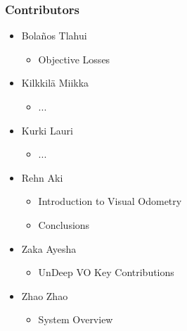 \documentclass{beamer}
\begin{document}
\begin{frame}
    \frametitle{Contributors}
    \begin{itemize}
        \item Bola\~nos Tlahui
            \begin{itemize}
                \item Objective Losses
            \end{itemize}
        \item Kilkkilä Miikka
            \begin{itemize}
                \item ...
            \end{itemize}
        \item Kurki Lauri
            \begin{itemize}
                \item ...
            \end{itemize}
        \item Rehn Aki
            \begin{itemize}
                \item Introduction to Visual Odometry
                \item Conclusions
            \end{itemize}
        \item Zaka Ayesha
            \begin{itemize}
                \item UnDeep VO Key Contributions
            \end{itemize}
        \item Zhao Zhao
            \begin{itemize}
                \item System Overview
            \end{itemize}
    \end{itemize}
    \center
\end{frame}
\end{document}
